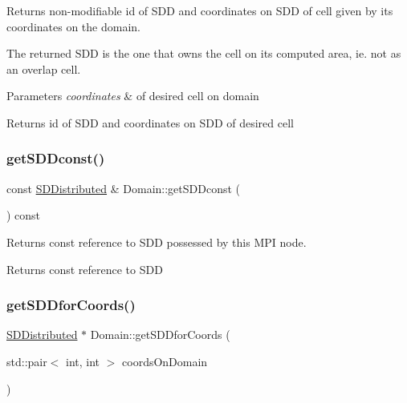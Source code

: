 Returns non-\/modifiable id of S\+DD and coordinates on S\+DD of cell given by its coordinates on the domain. 

The returned S\+DD is the one that owns the cell on its computed area, ie. not as an overlap cell.


\begin{DoxyParams}{Parameters}
{\em coordinates} & of desired cell on domain\\
\hline
\end{DoxyParams}
\begin{DoxyReturn}{Returns}
id of S\+DD and coordinates on S\+DD of desired cell 
\end{DoxyReturn}
\mbox{\label{classDomain_a8172470afa3d3ec4c7202c8ee25ab3b8}} 
\subsubsection{\texorpdfstring{get\+S\+D\+Dconst()}{getSDDconst()}}
{\footnotesize\ttfamily const \hyperlink{classSDDistributed}{S\+D\+Distributed} \& Domain\+::get\+S\+D\+Dconst (\begin{DoxyParamCaption}{ }\end{DoxyParamCaption}) const}



Returns const reference to S\+DD possessed by this M\+PI node. 

\begin{DoxyReturn}{Returns}
const reference to S\+DD 
\end{DoxyReturn}
\mbox{\label{classDomain_a893851a7caff52261beb79888d46be1f}} 
\subsubsection{\texorpdfstring{get\+S\+D\+Dfor\+Coords()}{getSDDforCoords()}}
{\footnotesize\ttfamily \hyperlink{classSDDistributed}{S\+D\+Distributed} $\ast$ Domain\+::get\+S\+D\+Dfor\+Coords (\begin{DoxyParamCaption}\item[{std\+::pair$<$ int, int $>$}]{coords\+On\+Domain }\end{DoxyParamCaption})}



